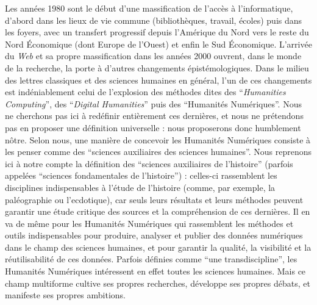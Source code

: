 Les années 1980 sont le début d'une massification de l'accès à l'informatique, d'abord dans les lieux de vie commune (bibliothèques, travail, écoles) puis dans les foyers, avec un transfert progressif depuis l'Amérique du Nord vers le reste du Nord Économique (dont Europe de l'Ouest) et enfin le Sud Économique. L'arrivée du \textit{Web} et sa propre massification dans les années 2000 ouvrent, dans le monde de la recherche, la porte à d'autres changements épistémologiques. Dans le milieu des lettres classiques et des sciences humaines en général, l'un de ces changements est indéniablement celui de l'explosion des méthodes dites des \enquote{\textit{Humanities Computing}}, des \enquote{\textit{Digital Humanities}} puis des \enquote{Humanités Numériques}. Nous ne cherchons pas ici à redéfinir entièrement ces dernières, et nous ne prétendons pas en proposer une définition universelle : nous proposerons donc humblement nôtre. Selon nous, une manière de concevoir les Humanités Numériques consiste à les penser comme des \enquote{sciences auxiliaires des sciences humaines}. Nous reprenons ici à notre compte la définition des \enquote{sciences auxiliaires de l'histoire} (parfois appelées \enquote{sciences fondamentales de l'histoire}) : celles-ci rassemblent les disciplines indispensables à l'étude de l'histoire (comme, par exemple, la paléographie ou l'ecdotique), car seuls leurs résultats et leurs méthodes peuvent garantir une étude critique des sources et la compréhension de ces dernières. Il en va de même pour les Humanités Numériques qui rassemblent les méthodes et outils indispensables pour produire, analyser et publier des données numériques dans le champ des sciences humaines, et pour garantir la qualité, la visibilité et la réutilisabilité de ces données. Parfois définies comme \enquote{une transdiscipline}, 
les Humanités Numériques intéressent en effet toutes les sciences humaines. Mais ce champ multiforme cultive ses propres recherches, développe ses propres débats, et manifeste ses propres ambitions.


